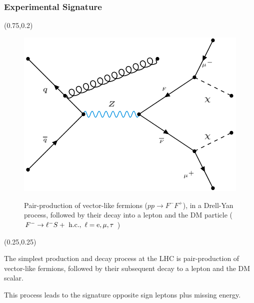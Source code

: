 \documentclass{beamer}
\numberwithin{figure}{section}
\begin{document}
\begin{frame}
\frametitle{Experimental Signature}

\begin{textblock*}{0.5\linewidth}(0.75\linewidth,0.2\linewidth) %

\begin{figure}[!tbp]
	\centering
	\includegraphics[width=1\textwidth]{pictures/DYVLF}\label{fig:f1}
	\caption{{\scriptsize Pair-production of vector-like fermions ($p p \to F^- F^+ $),
	in a Drell-Yan process, followed by their decay into a lepton and the DM particle ($F^- \to \ell^- S +\rm{\ h.c.},\ \ell=e,\mu,\tau$ )}}
	
\end{figure}
\end{textblock*}

\begin{textblock*}{0.46 \linewidth}(0.25\linewidth,0.25\linewidth) %
{\small {\justify The simplest production and decay process at the LHC
is pair-production of vector-like fermions,
followed by their subsequent decay to a lepton and the DM scalar.

This process leads to the signature opposite sign leptons plus missing energy.


}}
\end{textblock*}

\end{frame}
\end{document}
